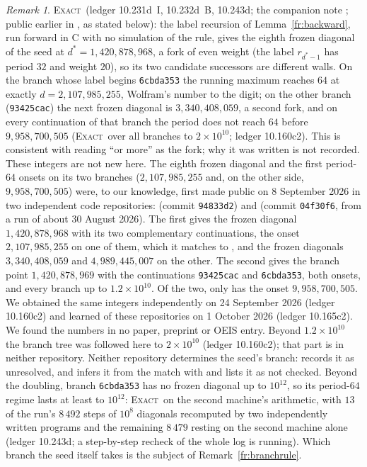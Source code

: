 \documentclass[11pt]{article}
\theoremstyle{definition}
\theoremstyle{remark}
\newtheorem{remark}[theorem]{Remark}
\newcommand{\EXACT}{\textsc{Exact}}
\begin{document}
\begin{remark}
\EXACT\ (ledger 10.231d~I, 10.232d~B, 10.243d; the companion note \cite{WN}; public earlier in \cite{Dib,Pat}, as stated below): the label recursion of Lemma~\ref{fr:backward}, run forward in C with no simulation of the rule, gives the eighth frozen diagonal of the seed at $d^{*}=1{,}420{,}878{,}968$, a fork of even weight (the label $r_{d^{*}-1}$ has period $32$ and weight $20$), so its two candidate successors are different walls. On the branch whose label begins \texttt{6cbda353} the running maximum reaches $64$ at exactly $d=2{,}107{,}985{,}255$, Wolfram's number to the digit; on the other branch (\texttt{93425cac}) the next frozen diagonal is $3{,}340{,}408{,}059$, a second fork, and on every continuation of that branch the period does not reach $64$ before $9{,}958{,}700{,}505$ (\EXACT\ over all branches to $2\times10^{10}$; ledger 10.160c2). This is consistent with reading ``or more'' as the fork; why it was written is not recorded. These integers are not new here. The eighth frozen diagonal and the first period-$64$ onsets on its two branches ($2{,}107{,}985{,}255$ and, on the other side, $9{,}958{,}700{,}505$) were, to our knowledge, first made public on 8 September 2026 in two independent code repositories: \cite{Dib} (commit \texttt{94833d2}) and \cite{Pat} (commit \texttt{04f30f6}, from a run of about 30 August 2026). The first gives the frozen diagonal $1{,}420{,}878{,}968$ with its two complementary continuations, the onset $2{,}107{,}985{,}255$ on one of them, which it matches to \cite[p.~871]{NKS}, and the frozen diagonals $3{,}340{,}408{,}059$ and $4{,}989{,}445{,}007$ on the other. The second gives the branch point $1{,}420{,}878{,}969$ with the continuations \texttt{93425cac} and \texttt{6cbda353}, both onsets, and every branch up to $1.2\times10^{10}$. Of the two, only \cite{Pat} has the onset $9{,}958{,}700{,}505$. We obtained the same integers independently on 24 September 2026 (ledger 10.160c2) and learned of these repositories on 1 October 2026 (ledger 10.165c2). We found the numbers in no paper, preprint or OEIS entry. Beyond $1.2\times10^{10}$ the branch tree was followed here to $2\times10^{10}$ (ledger 10.160c2); that part is in neither repository. Neither repository determines the seed's branch: \cite{Pat} records it as unresolved, and \cite{Dib} infers it from the match with \cite{NKS} and lists it as not checked. Beyond the doubling, branch \texttt{6cbda353} has no frozen diagonal up to $10^{12}$, so its period-$64$ regime lasts at least to $10^{12}$: \EXACT\ on the second machine's arithmetic, with $13$ of the run's $8\,492$ steps of $10^{8}$ diagonals recomputed by two independently written programs and the remaining $8\,479$ resting on the second machine alone (ledger 10.243d; a step-by-step recheck of the whole log is running). Which branch the seed itself takes is the subject of Remark~\ref{fr:branchrule}.
\end{remark}
\end{document}
